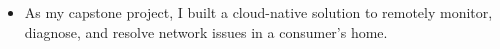 \documentclass[10pt,a4paper,ragged2e,withhyper]{altacv}
\begin{document}
\begin{paracol}{2}
\divider\smallskip





\medskip



\begin{itemize}
\item As my capstone project, I built a cloud-native solution to remotely monitor, diagnose, and resolve network issues in a consumer's home.
\end{itemize}

\end{paracol}
\end{document}
